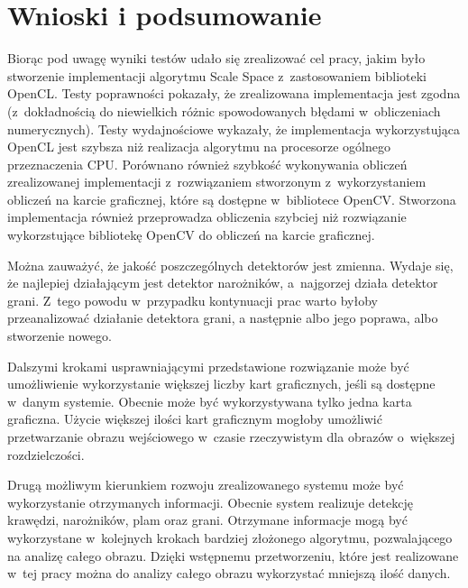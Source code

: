 \chapter{Wnioski i podsumowanie}
\label{cha:podsumowanie}

Biorąc pod uwagę wyniki testów udało się zrealizować cel pracy, jakim było stworzenie implementacji algorytmu Scale Space z~zastosowaniem biblioteki OpenCL. Testy poprawności pokazały, że zrealizowana implementacja jest zgodna (z~dokładnością do niewielkich różnic spowodowanych błędami w~obliczeniach numerycznych). Testy wydajnościowe wykazały, że implementacja wykorzystująca OpenCL jest szybsza niż realizacja algorytmu na procesorze ogólnego przeznaczenia CPU. Porównano również szybkość wykonywania obliczeń zrealizowanej implementacji z~rozwiązaniem stworzonym z~wykorzystaniem obliczeń na karcie graficznej, które są dostępne w~bibliotece OpenCV. Stworzona implementacja również przeprowadza obliczenia szybciej niż rozwiązanie wykorzstujące bibliotekę OpenCV do obliczeń na karcie graficznej.

Można zauważyć, że jakość poszczególnych detektorów jest zmienna. Wydaje się, że najlepiej działającym jest detektor narożników, a~najgorzej działa detektor grani. Z~tego powodu w~przypadku kontynuacji prac warto byłoby przeanalizować działanie detektora grani, a następnie albo jego poprawa, albo stworzenie nowego.

Dalszymi krokami usprawniającymi przedstawione rozwiązanie może być umożliwienie wykorzystanie większej liczby kart graficznych, jeśli są dostępne w~danym systemie. Obecnie może być wykorzystywana tylko jedna karta graficzna. Użycie większej ilości kart graficznym mogłoby umożliwić przetwarzanie obrazu wejściowego w~czasie rzeczywistym dla obrazów o~większej rozdzielczości.

Drugą możliwym kierunkiem rozwoju zrealizowanego systemu może być wykorzystanie otrzymanych informacji. Obecnie system realizuje detekcję krawędzi, narożników, plam oraz grani. Otrzymane informacje mogą być wykorzystane w~kolejnych krokach bardziej złożonego algorytmu, pozwalającego na analizę całego obrazu. Dzięki wstępnemu przetworzeniu, które jest realizowane w~tej pracy można do analizy całego obrazu wykorzystać mniejszą ilość danych.
